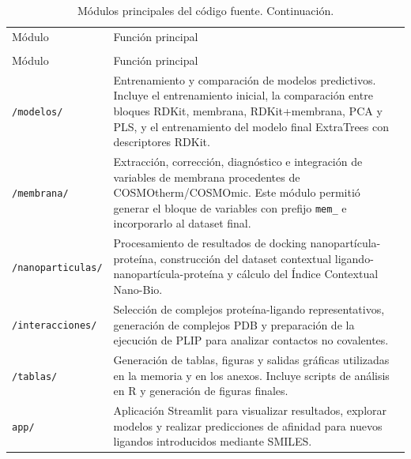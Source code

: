 \documentclass[
  spanish,
  a4paper,
  12pt,
  oneside,
  openany]{memoir}
\begin{document}
\begin{longtable}{p{}p{}}

\caption{\label{tbl-anexo-scripts}Módulos principales del código fuente.}

\tabularnewline

\\
\toprule
Módulo & Función principal \\
\midrule
\endfirsthead

\caption[]{Módulos principales del código fuente. Continuación.}\\
\toprule
Módulo & Función principal \\
\midrule
\endhead

\bottomrule
\endlastfoot

\texttt{/modelos/} &
Entrenamiento y comparación de modelos predictivos. Incluye el entrenamiento inicial, la comparación entre bloques RDKit, membrana, RDKit+membrana, PCA y PLS, y el entrenamiento del modelo final ExtraTrees con descriptores RDKit. \\

\texttt{/membrana/} &
Extracción, corrección, diagnóstico e integración de variables de membrana procedentes de COSMOtherm/COSMOmic. Este módulo permitió generar el bloque de variables con prefijo \texttt{mem\_} e incorporarlo al dataset final. \\

\texttt{/nanoparticulas/} &
Procesamiento de resultados de docking nanopartícula-proteína, construcción del dataset contextual ligando-nanopartícula-proteína y cálculo del Índice Contextual Nano-Bio. \\

\texttt{/interacciones/} &
Selección de complejos proteína-ligando representativos, generación de complejos PDB y preparación de la ejecución de PLIP para analizar contactos no covalentes. \\

\texttt{/tablas/} &
Generación de tablas, figuras y salidas gráficas utilizadas en la memoria y en los anexos. Incluye scripts de análisis en R y generación de figuras finales. \\

\texttt{app/} &
Aplicación Streamlit para visualizar resultados, explorar modelos y realizar predicciones de afinidad para nuevos ligandos introducidos mediante SMILES. \\

\end{longtable}
\end{document}
